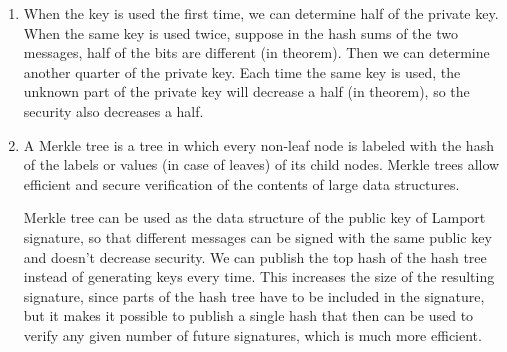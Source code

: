\documentclass{article}
\begin{document}
\begin{enumerate}
\item
When the key is used the first time, we can determine half of the private key. When the same key is used twice, suppose in the hash sums of the two messages, half of the bits are different (in theorem). Then we can determine another quarter of the private key. Each time the same key is used, the unknown part of the private key will decrease a half (in theorem), so the security also decreases a half.

\item
A Merkle tree is a tree in which every non-leaf node is labeled with the hash of the labels or values (in case of leaves) of its child nodes. Merkle trees allow efficient and secure verification of the contents of large data structures. 

Merkle tree can be used as the data structure of the public key of Lamport signature, so that different messages can be signed with the same public key and doesn't decrease security. We can publish the top hash of the hash tree instead of generating keys every time. This increases the size of the resulting signature, since parts of the hash tree have to be included in the signature, but it makes it possible to publish a single hash that then can be used to verify any given number of future signatures, which is much more efficient.

\end{enumerate}
\end{document}
